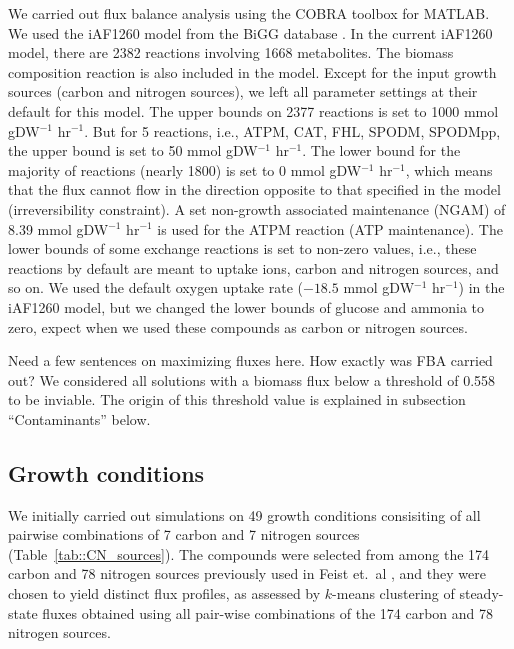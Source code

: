 \documentclass[12pt]{article}
\begin{document}
We carried out flux balance analysis using the COBRA toolbox \cite{Schellenbergeretal2011} for MATLAB. 
We used the iAF1260 model from the BiGG database \cite{Schellenbergeretal2010}. In the current iAF1260 model, there are 2382 reactions involving 1668 metabolites. The biomass composition reaction is also included in the model. Except for the input growth sources (carbon and nitrogen sources), we left all parameter settings at their default for this model. The upper bounds on 2377 reactions is set to 1000  mmol gDW$^{-1}$ hr$^{-1}$. But for 5 reactions, i.e., ATPM, CAT, FHL, SPODM, SPODMpp, the upper bound is set to 50 mmol gDW$^{-1}$ hr$^{-1}$. The lower bound for the majority of reactions (nearly 1800) is set to 0 mmol gDW$^{-1}$ hr$^{-1}$, which means that the flux cannot flow in the direction opposite to that specified in the model (irreversibility constraint). A set non-growth associated maintenance (NGAM) of 8.39  mmol gDW$^{-1}$ hr$^{-1}$ is used for the ATPM reaction (ATP maintenance). The lower bounds of some exchange reactions is set to non-zero values, i.e., these reactions by default are meant to uptake ions, carbon and nitrogen sources, and so on. We used the default oxygen uptake rate ($-18.5$ mmol gDW$^{-1}$ hr$^{-1}$) in the iAF1260 model, but we changed the lower bounds of glucose and ammonia to zero, expect when we used these compounds as carbon or nitrogen sources.

{\color{red}Need a few sentences on maximizing fluxes here. How exactly was FBA carried out?} We considered all solutions with a biomass flux below a threshold of 0.558 to be inviable. The origin of this threshold value is explained in subsection ``Contaminants'' below.

\subsection*{Growth conditions} 
We initially carried out simulations on 49 growth conditions consisiting of all pairwise combinations of 7 carbon and 7 nitrogen sources (Table~\ref{tab::CN_sources}). The compounds were selected from among the 174 carbon and 78 nitrogen sources previously used in Feist et.\ al \cite{Feistetal2007}, and they were chosen to yield distinct flux profiles, as assessed by $k$-means clustering of steady-state fluxes obtained using all pair-wise combinations of the 174 carbon and 78 nitrogen sources.
\end{document}
